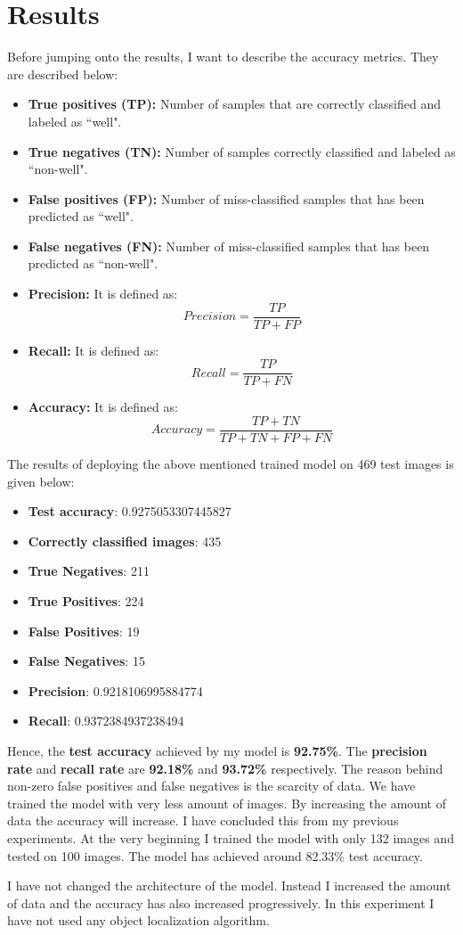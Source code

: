 \section{Results}
Before jumping onto the results, I want to describe the accuracy metrics. They are described below: 
\begin{itemize}
    \item \textbf{True positives (TP): }Number of samples that are correctly classified and labeled as ``well".
    \item \textbf{True negatives (TN): }Number of samples correctly classified and labeled as ``non-well".
    \item \textbf{False positives (FP): }Number of miss-classified samples that has been predicted as ``well".
    \item \textbf{False negatives (FN): }Number of miss-classified samples that has been predicted as ``non-well".
    \item \textbf{Precision: }It is defined as: $$Precision=\frac{TP}{TP+FP}$$
    \item \textbf{Recall: }It is defined as:
    $$Recall=\frac{TP}{TP+FN}$$
    \item \textbf{Accuracy: }It is defined as:
    $$Accuracy=\frac{TP+TN}{TP+TN+FP+FN}$$
\end{itemize}
The results of deploying the above mentioned trained model on 469 test images is given below:
\begin{itemize}
    \item \textbf{Test accuracy}:  0.9275053307445827
    \item \textbf{Correctly classified images}:  435
    \item \textbf{True Negatives}:  211
    \item \textbf{True Positives}:  224
    \item \textbf{False Positives}:  19
    \item \textbf{False Negatives}:  15
    \item \textbf{Precision}:  0.9218106995884774
    \item \textbf{Recall}:  0.9372384937238494
\end{itemize}

Hence, the \textbf{test accuracy} achieved by my model is \textbf{92.75\%}. The \textbf{precision rate} and \textbf{recall rate} are \textbf{92.18\%} and \textbf{93.72\%} respectively. The reason behind non-zero false positives and false negatives is the scarcity of data. We have trained the model with very less amount of images. By increasing the amount of data the accuracy will increase. I have concluded this from my previous experiments. At the very beginning I trained the model with only 132 images and tested on 100 images. The model has achieved around 82.33\% test accuracy. 
\par I have not changed the architecture of the model. Instead I increased the amount of data and the accuracy has also increased progressively. In this experiment I have not used any object localization algorithm.